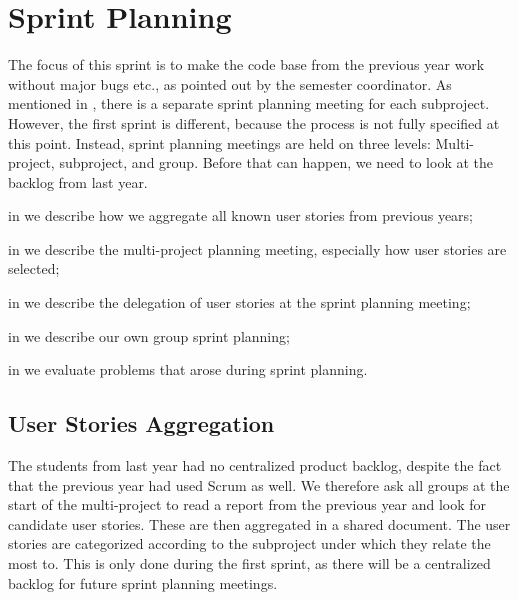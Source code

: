 \chapter{Sprint Planning}\label{chap:sprint1_planning}
The focus of this sprint is to make the code base from the previous year work without major bugs etc., as pointed out by the semester coordinator. As mentioned in , there is a separate sprint planning meeting for each subproject. However, the first sprint is different, because the process is not fully specified at this point. Instead, sprint planning meetings are held on three levels: Multi-project, subproject, and group. Before that can happen, we need to look at the backlog from last year.

\begin{chapterorganization}
  \item in  we describe how we aggregate all known user stories from previous years;
  \item in  we describe the multi-project planning meeting, especially how user stories are selected;
  \item in  we describe the delegation of user stories at the \bd sprint planning meeting;
  \item in  we describe our own group sprint planning;
  \item in  we evaluate problems that arose during sprint planning.
\end{chapterorganization}

\section{User Stories Aggregation}\label{sec:s1p_userstory}
The students from last year had no centralized product backlog, despite the fact that the previous year had used Scrum as well. We therefore ask all groups at the start of the multi-project to read a report from the previous year and look for candidate user stories. These are then aggregated in a shared document. The user stories are categorized according to the subproject under which they relate the most to. This is only done during the first sprint, as there will be a centralized backlog for future sprint planning meetings.

